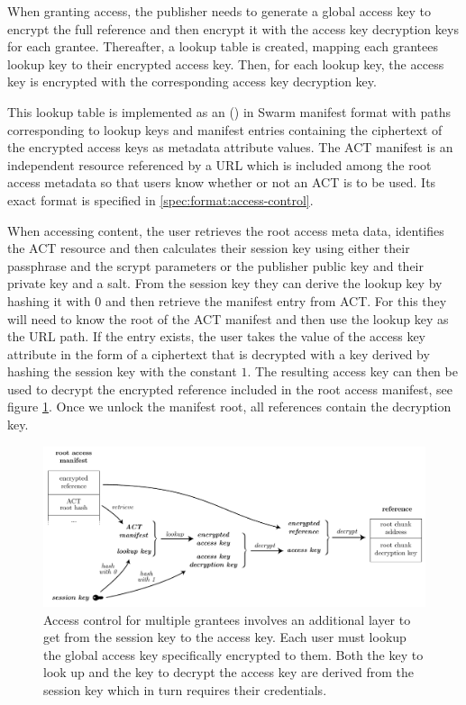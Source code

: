 When granting access, the publisher needs to generate a global access key to encrypt the full reference and then encrypt it with the
access key decryption keys for each grantee. Thereafter, a lookup table is created, mapping each grantees lookup key to their encrypted access key. Then, for each lookup key, the access key is encrypted with the corresponding access key decryption key.

This lookup table is implemented as an  () in Swarm manifest format with paths corresponding to lookup keys and manifest entries containing the ciphertext of the encrypted access keys as metadata attribute values. The ACT manifest is an independent resource referenced by a URL which is included among the root access metadata so that users know whether or not an ACT is to be used. Its exact format is specified in \ref{spec:format:access-control}.

When accessing content, the user retrieves the root access meta data, identifies the ACT resource and then calculates their session key using either their passphrase and the scrypt parameters or the publisher public key and their private key and a salt. From the session key they can derive the lookup key by hashing it with $0$ and then retrieve the manifest entry from ACT. For this they will need to know the root of the ACT manifest and then use the lookup key as the URL path. If the entry exists, the user takes the value of the access key attribute in the form of a ciphertext that is decrypted with a key derived by hashing the session key with the constant $1$. The resulting access key can then be used to decrypt the encrypted reference included in the root access manifest, see figure \ref{fig:access-control-multiple-party}. Once we unlock the manifest root, all references contain the decryption key.

\begin{figure}[htbp]
\centering
\includegraphics[width=\textwidth]{fig/access-control-multiple-party.pdf}
\caption[Access control for multiple grantees \statusyellow]{Access control for multiple grantees involves an additional layer to get from the session key to the access key. Each user must lookup the global access key specifically encrypted to them. Both the key to look up and the key to decrypt the access key are derived from the session key which in turn requires their credentials.} 
\label{fig:access-control-multiple-party}
\end{figure}


